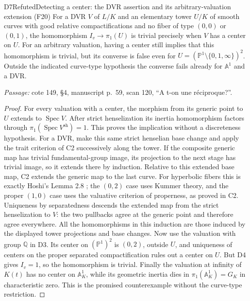 \begin{result}{D7}{Refuted}{Detecting a center: the DVR assertion and its arbitrary-valuation extension (F20)}
For a DVR $V$ of $L/K$ and an elementary tower $U/K$ of smooth curves with good relative compactifications and no fiber of type $(0,0)$ or $(0,1)$, the homomorphism $I_v\to\pi_1(U)$ is trivial precisely when $V$ has a center on $U$. For an arbitrary valuation, having a center still implies that this homomorphism is trivial, but its converse is false even for $U=(\mathbb P^1\setminus\{0,1,\infty\})^2$. Outside the indicated curve-type hypothesis the converse fails already for $\mathbb A^1$ and a DVR.
\par\emph{Passage:} cote 149, \S4, manuscript p.~59, scan 120, ``A t-on une r\'eciproque?''.
\end{result}
\begin{proof}
For every valuation with a center, the morphism from its generic point to $U$ extends to $\operatorname{Spec}V$. After strict henselization its inertia homomorphism factors through $\pi_1(\operatorname{Spec}V^{\mathrm{sh}})=1$. This proves the implication without a discreteness hypothesis.
For a DVR, make this same strict henselian base change and apply the trait criterion of C2 successively along the tower. If the composite generic map has trivial fundamental-group image, its projection to the next stage has trivial image, so it extends there by induction. Relative to this extended base map, C2 extends the generic map to the last curve. For hyperbolic fibers this is exactly Hoshi's Lemma 2.8 \cite{DE_Hoshi}; the $(0,2)$ case uses Kummer theory, and the proper $(1,0)$ case uses the valuative criterion of properness, as proved in C2. Uniqueness by separatedness descends the extended map from the strict henselization to $V$: the two pullbacks agree at the generic point and therefore agree everywhere. All the homomorphisms in this induction are those induced by the displayed tower projections and base changes.
Now use the valuation with group $\mathbb Q$ in D3. Its center on $(\mathbb P^1)^2$ is $(0,2)$, outside $U$, and uniqueness of centers on the proper separated compactification rules out a center on $U$. But D4 gives $I_v=1$, so the homomorphism is trivial. Finally the valuation at infinity of $K(t)$ has no center on $\mathbb A^1_K$, while its geometric inertia dies in $\pi_1(\mathbb A^1_K)=G_K$ in characteristic zero. This is the promised counterexample without the curve-type restriction.
\end{proof}

